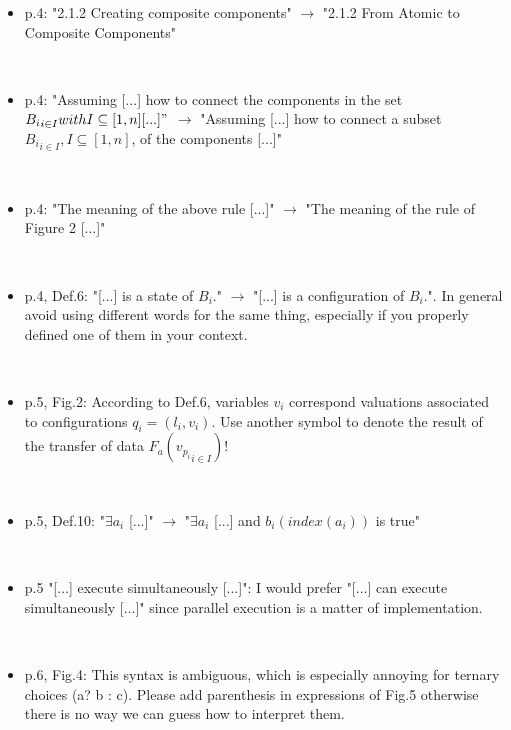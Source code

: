 \begin{itemize}
~

\done

\item p.4: "2.1.2 Creating composite components" $\rightarrow$ "2.1.2 From Atomic to 
Composite Components"

~

\done

\item p.4: "Assuming [...] how to connect the components in the set ${B_i}_{i \in 
I} with I \subseteq [1,n] [...]"$ $\rightarrow$ "Assuming [...] how to connect a subset 
${B_i}_{i \in I}, I \subseteq [1,n]$, of the components [...]"

~

\done

\item p.4: "The meaning of the above rule [...]" $\rightarrow$ "The meaning of the rule of 
Figure 2 [...]"

~

\done 

\item p.4, Def.6: "[...] is a state of $B_i$." $\rightarrow$ "[...] is a configuration of 
$B_i$.". In general avoid using different words for the same thing, especially 
if you properly defined one of them in your context.

~

\done
{}


\item p.5, Fig.2: According to Def.6, variables $v_i$ correspond valuations 
associated to configurations $q_i = (l_i, v_i)$. Use another symbol to denote 
the result of the transfer of data $F_a({ v_{p_i} }_{i \in I})$!

~

\done

\item p.5, Def.10: "$\exists a_i$ [...]" $\rightarrow$ "$\exists a_i$ [...] and $b_i(index(a_i))$ is 
true"

~

\done

\item p.5 "[...] execute simultaneously [...]": I would prefer "[...] can execute 
simultaneously [...]" since parallel execution is a matter of implementation.

~
\done
{}

\item p.6, Fig.4: This syntax is ambiguous, which is especially annoying for 
ternary choices (a? b : c). Please add parenthesis in expressions of Fig.5 
otherwise there is no way we can guess how to interpret them.


\end{itemize}

